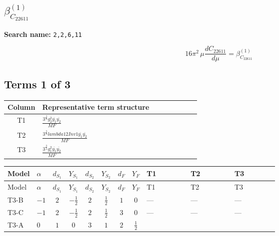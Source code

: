 \documentclass[8pt]{article}
\begin{document}
\begin{landscape}
\section*{$\beta_{C_{22611}}^{(1)}$}
\noindent\textbf{Search name: }\texttt{2,2,6,11}\par\smallskip
\[16\pi^2\,\mu\frac{d C_{22611}}{d\mu}=\beta_{C_{22611}}^{(1)}\]
\subsection*{Terms 1 of 3}
\begin{center}
\begin{tabular}{@{}c >{\raggedright\arraybackslash}p{0.82\linewidth}@{}}
\toprule
Column & Representative term structure \\
\midrule
T1 & \(\displaystyle \frac{3^{\frac{3}{4}} g_{2}^{2} \overline{y_{1}} \overline{y_{2}}}{MF}\) \\
\midrule
T2 & \(\displaystyle \frac{3^{\frac{3}{4}} lambda12Inv1 \overline{y_{1}} \overline{y_{2}}}{MF}\) \\
\midrule
T3 & \(\displaystyle \frac{3^{\frac{3}{4}} g_{1}^{2} \overline{y_{1}} \overline{y_{2}}}{MF}\) \\
\midrule
\bottomrule
\end{tabular}
\end{center}
\smallskip
\tiny
\begin{longtable}{@{}llcccccc >{\raggedright\arraybackslash}p{0.21\linewidth} >{\raggedright\arraybackslash}p{0.21\linewidth} >{\raggedright\arraybackslash}p{0.21\linewidth}@{}}
\toprule
Model & $\alpha$ & $d_{S_1}$ & $Y_{S_1}$ & $d_{S_2}$ & $Y_{S_2}$ & $d_F$ & $Y_F$ & T1 & T2 & T3 \\
\midrule
\endfirsthead
\toprule
Model & $\alpha$ & $d_{S_1}$ & $Y_{S_1}$ & $d_{S_2}$ & $Y_{S_2}$ & $d_F$ & $Y_F$ & T1 & T2 & T3 \\
\midrule
\endhead
T3-B & $-1$ & $2$ & $-\frac{1}{2}$ & $2$ & $\frac{1}{2}$ & $1$ & $0$ & --- & --- & --- \\
\midrule
T3-C & $-1$ & $2$ & $-\frac{1}{2}$ & $2$ & $\frac{1}{2}$ & $3$ & $0$ & --- & --- & --- \\
\midrule
T3-A & $0$ & $1$ & $0$ & $3$ & $1$ & $2$ & $\frac{1}{2}$ & \scriptsize\adjustbox{max width=\linewidth}{$\begin{gathered} - \frac{11 \cdot 3^{\frac{3}{4}} g_{2}^{2} \overline{y_{1}} \overline{y_{2}}}{8 MF}\end{gathered}$} & \scriptsize\adjustbox{max width=\linewidth}{$\begin{gathered} - \frac{3^{\frac{3}{4}} lambda12Inv1 \overline{y_{1}} \overline{y_{2}}}{6 MF}\end{gathered}$} & \scriptsize\adjustbox{max width=\linewidth}{$\begin{gathered} - \frac{3^{\frac{3}{4}} g_{1}^{2} \overline{y_{1}} \overline{y_{2}}}{8 MF}\end{gathered}$} \\

\end{longtable}
\end{landscape}
\end{document}
